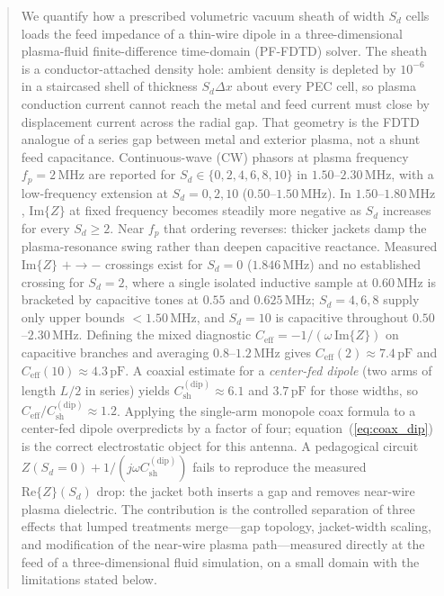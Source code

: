 \documentclass[draft]{agujournal2025}
\begin{document}
\begin{abstract}
We quantify how a prescribed volumetric vacuum sheath of width \(S_d\) cells loads the feed impedance of a thin-wire dipole in a three-dimensional plasma-fluid finite-difference time-domain (PF-FDTD) solver. The sheath is a conductor-attached density hole: ambient density is depleted by \(10^{-6}\) in a staircased shell of thickness \(S_d\Delta x\) about every PEC cell, so plasma conduction current cannot reach the metal and feed current must close by displacement current across the radial gap. That geometry is the FDTD analogue of a series gap between metal and exterior plasma, not a shunt feed capacitance. Continuous-wave (CW) phasors at plasma frequency \(f_p=2\,\mathrm{MHz}\) are reported for \(S_d\in\{0,2,4,6,8,10\}\) in \(1.50\)--\(2.30\,\mathrm{MHz}\), with a low-frequency extension at \(S_d=0,2,10\) (\(0.50\)--\(1.50\,\mathrm{MHz}\)). In \(1.50\)--\(1.80\,\mathrm{MHz}\), \(\mathrm{Im}\{Z\}\) at fixed frequency becomes steadily more negative as \(S_d\) increases for every \(S_d\ge 2\). Near \(f_p\) that ordering reverses: thicker jackets damp the plasma-resonance swing rather than deepen capacitive reactance. Measured \(\mathrm{Im}\{Z\}\) \(+\to-\) crossings exist for \(S_d=0\) (\(1.846\,\mathrm{MHz}\)) and no established crossing for \(S_d=2\), where a single isolated inductive sample at \(0.60\,\mathrm{MHz}\) is bracketed by capacitive tones at \(0.55\) and \(0.625\,\mathrm{MHz}\); \(S_d=4,6,8\) supply only upper bounds \(<1.50\,\mathrm{MHz}\), and \(S_d=10\) is capacitive throughout \(0.50\)--\(2.30\,\mathrm{MHz}\). Defining the mixed diagnostic \(C_\mathrm{eff}=-1/(\omega\,\mathrm{Im}\{Z\})\) on capacitive branches and averaging \(0.8\)--\(1.2\,\mathrm{MHz}\) gives \(C_\mathrm{eff}(2)\approx 7.4\,\mathrm{pF}\) and \(C_\mathrm{eff}(10)\approx 4.3\,\mathrm{pF}\). A coaxial estimate for a \emph{center-fed dipole} (two arms of length \(L/2\) in series) yields \(C_\mathrm{sh}^\mathrm{(dip)}\approx 6.1\) and \(3.7\,\mathrm{pF}\) for those widths, so \(C_\mathrm{eff}/C_\mathrm{sh}^\mathrm{(dip)}\approx 1.2\). Applying the single-arm monopole coax formula to a center-fed dipole overpredicts by a factor of four; equation~(\ref{eq:coax_dip}) is the correct electrostatic object for this antenna. A pedagogical circuit \(Z(S_d=0)+1/(j\omega C_\mathrm{sh}^\mathrm{(dip)})\) fails to reproduce the measured \(\mathrm{Re}\{Z\}(S_d)\) drop: the jacket both inserts a gap and removes near-wire plasma dielectric. The contribution is the controlled separation of three effects that lumped treatments merge---gap topology, jacket-width scaling, and modification of the near-wire plasma path---measured directly at the feed of a three-dimensional fluid simulation, on a small domain with the limitations stated below.

\end{abstract}
\end{document}
